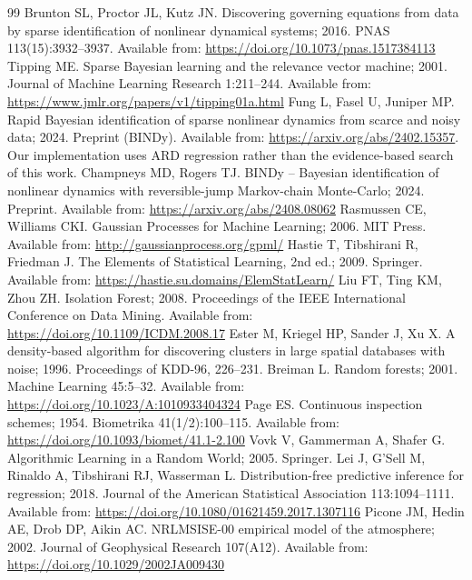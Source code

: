 \documentclass[11pt,a4paper]{article}
\begin{document}
\begin{thebibliography}{99}
 Brunton SL, Proctor JL, Kutz JN. Discovering governing equations from data by sparse identification of
  nonlinear dynamical systems; 2016. PNAS 113(15):3932--3937. Available from: \url{https://doi.org/10.1073/pnas.1517384113}
 Tipping ME. Sparse Bayesian learning and the relevance vector machine; 2001. Journal of Machine
  Learning Research 1:211--244. Available from: \url{https://www.jmlr.org/papers/v1/tipping01a.html}
 Fung L, Fasel U, Juniper MP. Rapid Bayesian identification of sparse nonlinear dynamics from scarce
  and noisy data; 2024. Preprint (BINDy). Available from: \url{https://arxiv.org/abs/2402.15357}. Our implementation
  uses ARD regression \cite{tipping} rather than the evidence-based search of this work.
 Champneys MD, Rogers TJ. BINDy -- Bayesian identification of nonlinear dynamics with
  reversible-jump Markov-chain Monte-Carlo; 2024. Preprint. Available from: \url{https://arxiv.org/abs/2408.08062}
 Rasmussen CE, Williams CKI. Gaussian Processes for Machine Learning; 2006. MIT Press.
  Available from: \url{http://gaussianprocess.org/gpml/}
 Hastie T, Tibshirani R, Friedman J. The Elements of Statistical Learning, 2nd ed.; 2009. Springer.
  Available from: \url{https://hastie.su.domains/ElemStatLearn/}
 Liu FT, Ting KM, Zhou ZH. Isolation Forest; 2008. Proceedings of the IEEE International Conference on
  Data Mining. Available from: \url{https://doi.org/10.1109/ICDM.2008.17}
 Ester M, Kriegel HP, Sander J, Xu X. A density-based algorithm for discovering clusters in large
  spatial databases with noise; 1996. Proceedings of KDD-96, 226--231.
 Breiman L. Random forests; 2001. Machine Learning 45:5--32.
  Available from: \url{https://doi.org/10.1023/A:1010933404324}
 Page ES. Continuous inspection schemes; 1954. Biometrika 41(1/2):100--115.
  Available from: \url{https://doi.org/10.1093/biomet/41.1-2.100}
 Vovk V, Gammerman A, Shafer G. Algorithmic Learning in a Random World; 2005. Springer.
 Lei J, G'Sell M, Rinaldo A, Tibshirani RJ, Wasserman L. Distribution-free predictive inference for
  regression; 2018. Journal of the American Statistical Association 113:1094--1111.
  Available from: \url{https://doi.org/10.1080/01621459.2017.1307116}
 Picone JM, Hedin AE, Drob DP, Aikin AC. NRLMSISE-00 empirical model of the atmosphere; 2002. Journal of
  Geophysical Research 107(A12). Available from: \url{https://doi.org/10.1029/2002JA009430}

\end{thebibliography}
\end{document}
